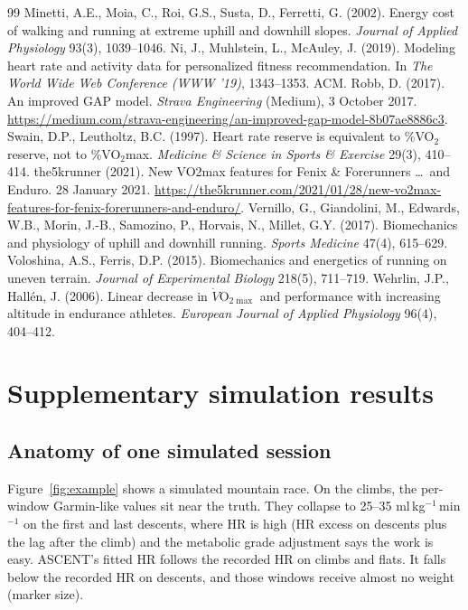 \documentclass[11pt,a4paper]{article}
\newcommand{\unit}{ml\,kg$^{-1}$\,min$^{-1}$}
\newcommand{\ascent}{ASCENT}
\begin{document}
\begin{thebibliography}{99}
 Minetti, A.E., Moia, C., Roi, G.S., Susta, D., Ferretti, G. (2002). Energy cost of walking and running at extreme uphill and downhill slopes. \emph{Journal of Applied Physiology} 93(3), 1039--1046.
 Ni, J., Muhlstein, L., McAuley, J. (2019). Modeling heart rate and activity data for personalized fitness recommendation. In \emph{The World Wide Web Conference (WWW '19)}, 1343--1353. ACM.
 Robb, D. (2017). An improved GAP model. \emph{Strava Engineering} (Medium), 3 October 2017. \url{https://medium.com/strava-engineering/an-improved-gap-model-8b07ae8886c3}.
 Swain, D.P., Leutholtz, B.C. (1997). Heart rate reserve is equivalent to \%VO$_2$ reserve, not to \%VO$_2$max. \emph{Medicine \& Science in Sports \& Exercise} 29(3), 410--414.
 the5krunner (2021). New VO2max features for Fenix \& Forerunners \ldots\ and Enduro. 28 January 2021. \url{https://the5krunner.com/2021/01/28/new-vo2max-features-for-fenix-forerunners-and-enduro/}.
 Vernillo, G., Giandolini, M., Edwards, W.B., Morin, J.-B., Samozino, P., Horvais, N., Millet, G.Y. (2017). Biomechanics and physiology of uphill and downhill running. \emph{Sports Medicine} 47(4), 615--629.
 Voloshina, A.S., Ferris, D.P. (2015). Biomechanics and energetics of running on uneven terrain. \emph{Journal of Experimental Biology} 218(5), 711--719.
 Wehrlin, J.P., Hall\'en, J. (2006). Linear decrease in $\dot V$O$_{2\max}$ and performance with increasing altitude in endurance athletes. \emph{European Journal of Applied Physiology} 96(4), 404--412.
\end{thebibliography}

\appendix

\section{Supplementary simulation results}\label{app:supp}
\subsection{Anatomy of one simulated session}
Figure~\ref{fig:example} shows a simulated mountain race. On the climbs, the per-window Garmin-like values sit near the truth. They collapse to 25--35 \unit{} on the first and last descents, where HR is high (HR excess on descents plus the lag after the climb) and the metabolic grade adjustment says the work is easy. \ascent's fitted HR follows the recorded HR on climbs and flats. It falls below the recorded HR on descents, and those windows receive almost no weight (marker size).
\end{document}
